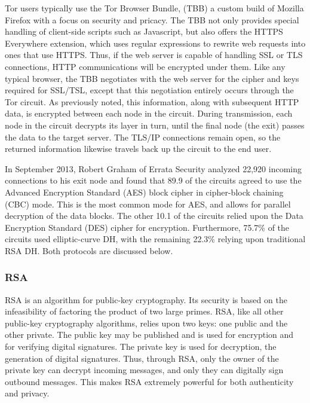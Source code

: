 \documentclass[journal]{IEEEtran}
\begin{document}
Tor users typically use the Tor Browser Bundle, (TBB) a custom build of Mozilla Firefox with a focus on security and pricacy. The TBB not only provides special handling of client-side scripts such as Javascript, but also offers the HTTPS Everywhere extension, which uses regular expressions to rewrite web requests into ones that use HTTPS. Thus, if the web server is capable of handling SSL or TLS connections, HTTP communications will be encrypted under them. Like any typical browser, the TBB negotiates with the web server for the cipher and keys required for SSL/TSL, except that this negotiation entirely occurs through the Tor circuit. As previously noted, this information, along with subsequent HTTP data, is encrypted between each node in the circuit. During transmission, each node in the circuit decrypts its layer in turn, until the final node (the exit) passes the data to the target server. The TLS/IP connections remain open, so the returned information likewise travels back up the circuit to the end user.

In September 2013, Robert Graham of Errata Security analyzed 22,920 incoming connections to his exit node and found that 89.9\; of the circuits agreed to use the Advanced Encryption Standard (AES) block cipher in cipher-block chaining (CBC) mode. This is the most common mode for AES, and allows for parallel decryption of the data blocks. The other 10.1\; of the circuits relied upon the Data Encryption Standard (DES) cipher for encryption. Furthermore, 75.7\% of the circuits used elliptic-curve DH, with the remaining 22.3\% relying upon traditional RSA DH.\cite{Graham2013} Both protocols are discussed below.

\subsubsection{RSA}

RSA is an algorithm for public-key cryptography. Its security is based on the infeasibility of factoring the product of two large primes. RSA, like all other public-key cryptography algorithms, relies upon two keys: one public and the other private. The public key may be published and is used for encryption and for verifying digital signatures. The private key is used for decryption, the generation of digital signatures. Thus, through RSA, only the owner of the private key can decrypt incoming messages, and only they can digitally sign outbound messages. This makes RSA extremely powerful for both authenticity and privacy.
\end{document}
